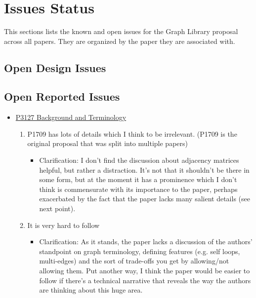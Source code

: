 \section{Issues Status}
This sections lists the known and open issues for the Graph Library proposal across all papers. They are organized
by the paper they are associated with.

\subsection{Open Design Issues}

\subsection{Open Reported Issues}
\begin{itemize}
      \item \href{https://www.wg21.link/P3127}{P3127 Background and Terminology}
            \begin{enumerate}
                  \item P1709 has lots of details which I think to be irrelevant. (P1709 is the original proposal that was split into multiple papers)
                        \begin{itemize}
                              \item Clarification: I don't find the discussion about adjacency matrices helpful, but rather a distraction. 
                                    It's not that it shouldn't be there in some form, but at the moment it has a prominence which I don't think is 
                                    commensurate with its importance to the paper, perhaps exacerbated by the fact that the paper lacks many salient details (see next point).
                        \end{itemize}
                  \item It is very hard to follow
                        \begin{itemize}
                              \item Clarification: As it stands, the paper lacks a discussion of the authors' standpoint on graph terminology, defining features 
                                    (e.g. self loops, multi-edges) and the sort of trade-offs you get by allowing/not allowing them. Put another way, I think the 
                                    paper would be easier to follow if there's a technical narrative that reveals the way the authors are thinking about this huge area. 


\end{itemize}
\end{enumerate}
\end{itemize}
